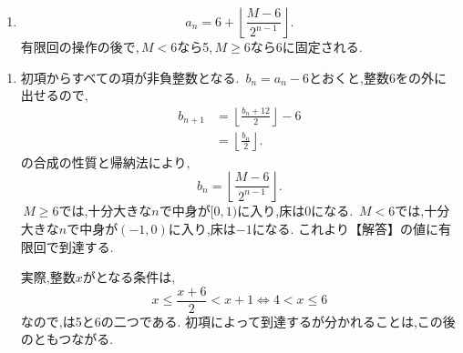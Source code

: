    \noindent {}\par\nobreak
    \begin{enumerate}[label=(\arabic*),parsep=3pt,beginpenalty=10000,format=\bookitemlink{example-gauss-role-6}{answer}{problem}]
      \item \[
              a_n=6+\left\lfloor\frac{M-6}{2^{n-1}}\right\rfloor.
            \]
            有限回の操作の後で,\,$M<6$なら5,\,$M\ge6$なら6に固定される.
    \end{enumerate}

    \noindent {}\par\nobreak
    \begin{enumerate}[label=(\arabic*),parsep=3pt,beginpenalty=10000,format=\bookitemlink{example-gauss-role-6}{solution}{problem}]
      \item 初項からすべての項が非負整数となる.
            \,$b_n=a_n-6$とおくと,整数6をの外に出せるので,
            \begin{align*}
              b_{n+1}
                &=\left\lfloor\frac{b_n+12}{2}\right\rfloor-6\\
                &=\left\lfloor\frac{b_n}{2}\right\rfloor.
            \end{align*}
            の合成の性質と帰納法により,
            \[
              b_n=\left\lfloor\frac{M-6}{2^{n-1}}\right\rfloor.
            \]
            \,$M\ge6$では,十分大きな$n$で中身が$[0,1)$に入り,床は0になる.
            \,$M<6$では,十分大きな$n$で中身が$(-1,0)$に入り,床は$-1$になる.
            これより【解答】の値に有限回で到達する.

            実際,整数$x$がとなる条件は,
            \[
              x\le\frac{x+6}{2}<x+1
              \iff 4<x\le6
            \]
            なので,は5と6の二つである.
            初項によって到達するが分かれることは,この後のともつながる.
    \end{enumerate}
